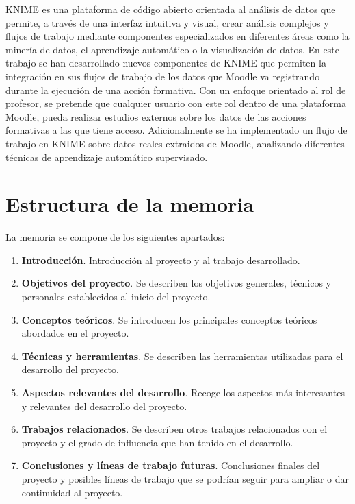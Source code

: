 KNIME es una plataforma de código abierto orientada al análisis de datos que permite, a través de una interfaz intuitiva y visual, 
crear análisis complejos y flujos de trabajo mediante componentes especializados en diferentes áreas como la minería de datos, 
el aprendizaje automático o la visualización de datos. En este trabajo se han desarrollado nuevos componentes de KNIME que permiten la 
integración en sus flujos de trabajo de los datos que Moodle va registrando durante la ejecución de una acción formativa. 
Con un enfoque orientado al rol de profesor, se pretende que cualquier usuario con este rol dentro de una 
plataforma Moodle, pueda realizar estudios externos sobre los datos de las acciones formativas a las que tiene acceso. 
Adicionalmente se ha implementado un flujo de trabajo en KNIME sobre datos reales extraidos de Moodle, analizando diferentes 
técnicas de aprendizaje automático supervisado. 
\


\section{Estructura de la memoria}

La memoria se compone de los siguientes apartados: 
\

\begin{enumerate}
	\item \textbf{Introducción}. Introducción al proyecto y al trabajo desarrollado. 
	\item \textbf{Objetivos del proyecto}. Se describen los objetivos generales, técnicos y personales establecidos al inicio del proyecto.
	\item \textbf{Conceptos teóricos}. Se introducen los principales conceptos teóricos abordados en el proyecto. 
	\item \textbf{Técnicas y herramientas}. Se describen las herramientas utilizadas para el desarrollo del proyecto.
	\item \textbf{Aspectos relevantes del desarrollo}. Recoge los aspectos más interesantes y relevantes del desarrollo del proyecto.
	\item \textbf{Trabajos relacionados}. Se describen otros trabajos relacionados con el proyecto y el grado de influencia que han tenido en el desarrollo.
	\item \textbf{Conclusiones y líneas de trabajo futuras}. Conclusiones finales del proyecto y posibles líneas de trabajo que se podrían seguir para ampliar o dar continuidad al proyecto. 
\end{enumerate}


